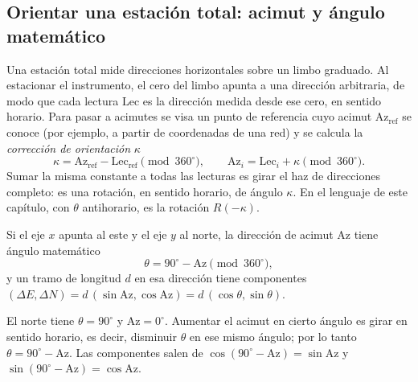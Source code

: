 \subsection{Orientar una estación total: acimut y ángulo matemático}\label{sec:acimut-campo}

Una estación total mide direcciones horizontales sobre un limbo graduado. Al estacionar el
instrumento, el cero del limbo apunta a una dirección arbitraria, de modo que cada lectura
\(\mathrm{Lec}\) es la dirección medida desde ese cero, en sentido horario. Para pasar a
acimutes se visa un punto de referencia cuyo acimut \(\mathrm{Az}_{\text{ref}}\) se conoce
(por ejemplo, a partir de coordenadas de una red) y se calcula la \emph{corrección de
orientación} \(\kappa\)
\[
\kappa=\mathrm{Az}_{\text{ref}}-\mathrm{Lec}_{\text{ref}}\pmod{360^\circ},
\qquad
\mathrm{Az}_i=\mathrm{Lec}_i+\kappa\pmod{360^\circ}.
\]
Sumar la misma constante a todas las lecturas es girar el haz de direcciones completo: es una
rotación, en sentido horario, de ángulo \(\kappa\). En el lenguaje de este capítulo, con
\(\theta\) antihorario, es la rotación \(R(-\kappa)\).

\begin{proposicion}\label{prop:acimut-theta}
Si el eje \(x\) apunta al este y el eje \(y\) al norte, la dirección de acimut \(\mathrm{Az}\)
tiene ángulo matemático
\[
\theta=90^\circ-\mathrm{Az}\pmod{360^\circ},
\]
y un tramo de longitud \(d\) en esa dirección tiene componentes
\((\Delta E,\Delta N)=d\,(\sin\mathrm{Az},\cos\mathrm{Az})=d\,(\cos\theta,\sin\theta)\).
\end{proposicion}

\begin{demostracion}
El norte tiene \(\theta=90^\circ\) y \(\mathrm{Az}=0^\circ\). Aumentar el acimut en cierto ángulo
es girar en sentido horario, es decir, disminuir \(\theta\) en ese mismo ángulo; por lo tanto
\(\theta=90^\circ-\mathrm{Az}\). Las componentes salen de
\(\cos(90^\circ-\mathrm{Az})=\sin\mathrm{Az}\) y \(\sin(90^\circ-\mathrm{Az})=\cos\mathrm{Az}\).
\end{demostracion}

